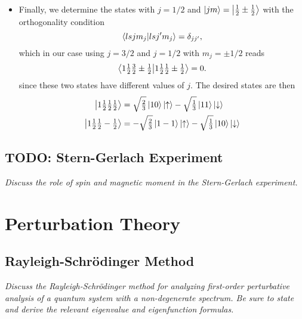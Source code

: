 \documentclass[11pt, a4paper]{article}
\newcommand{\Schro}{Schr\"{o}dinger\xspace}
\newcommand{\ua}{\uparrow}  %
\newcommand{\da}{\downarrow}  %
\begin{document}
\begin{itemize}
    \item Finally, we determine the states with $ j = 1/2 $ and $ \ket{jm} = \ket{\tfrac{1}{2} \pm \tfrac{1}{2}} $ with the orthogonality condition
    \begin{equation*}
        \braket{lsjm_{j}}{lsj'm_{j}} = \delta_{jj'},
    \end{equation*}
    which in our case using $ j = 3/2 $ and $ j = 1/2 $ with $ m_{j} = \pm 1/2 $ reads
    \begin{equation*}
        \braket{1 \tfrac{1}{2}\tfrac{3}{2}\pm \tfrac{1}{2}}{1 \tfrac{1}{2}\tfrac{1}{2}\pm \tfrac{1}{2}} = 0.
    \end{equation*}
    since these two states have different values of $ j $. The desired states are then
    \begin{align*}
        \ket{1 \tfrac{1}{2}\tfrac{1}{2}\tfrac{1}{2}} &= \sqrt{\tfrac{2}{3}}\ket{10} \ket{\ua} - \sqrt{\tfrac{1}{3}} \ket{11}\ket{\da}\\
        \ket{1 \tfrac{1}{2}\tfrac{1}{2}-\tfrac{1}{2}} &= -\sqrt{\tfrac{2}{3}}\ket{1-1} \ket{\ua} - \sqrt{\tfrac{1}{3}} \ket{10}\ket{\da}\\
    \end{align*}
\end{itemize}



\subsection{TODO: Stern-Gerlach Experiment}
\textit{Discuss the role of spin and magnetic moment in the Stern-Gerlach experiment.}


\newpage
\section{Perturbation Theory}

\subsection{Rayleigh-\Schro Method}
\textit{Discuss the Rayleigh-\Schro method for analyzing first-order perturbative analysis of a quantum system with a non-degenerate spectrum. Be sure to state and derive the relevant eigenvalue and eigenfunction formulas.}
\end{document}
